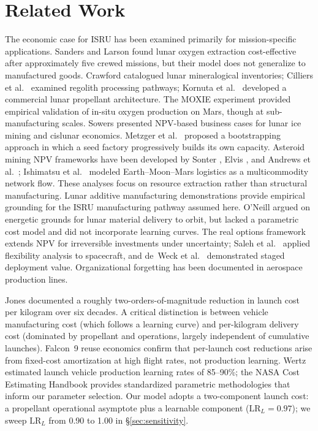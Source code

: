 \documentclass[5p,twocolumn]{elsarticle}
\begin{document}
\section{Related Work}
\label{sec:related}

The economic case for ISRU has been examined primarily for mission-specific applications. Sanders and Larson \cite{sanders2015} found lunar oxygen extraction cost-effective after approximately five crewed missions, but their model does not generalize to manufactured goods. Crawford \cite{crawford2015} catalogued lunar mineralogical inventories; Cilliers et al.\ \cite{cilliers2023} examined regolith processing pathways; Kornuta et al.\ \cite{kornuta2019} developed a commercial lunar propellant architecture. The MOXIE experiment \cite{hecht2021} provided empirical validation of in-situ oxygen production on Mars, though at sub-manufacturing scales. Sowers \cite{sowers2021,sowers2023} presented NPV-based business cases for lunar ice mining and cislunar economics. Metzger et al.\ \cite{metzger2013} proposed a bootstrapping approach in which a seed factory progressively builds its own capacity. Asteroid mining NPV frameworks have been developed by Sonter \cite{sonter1997}, Elvis \cite{elvis2012}, and Andrews et al.\ \cite{andrews2015}; Ishimatsu et al.\ \cite{ishimatsu2016} modeled Earth--Moon--Mars logistics as a multicommodity network flow. These analyses focus on resource extraction rather than structural manufacturing. Lunar additive manufacturing demonstrations \cite{werkheiser2015,cesaretti2014} provide empirical grounding for the ISRU manufacturing pathway assumed here. O'Neill \cite{oneill1974,oneill1976} argued on energetic grounds for lunar material delivery to orbit, but lacked a parametric cost model and did not incorporate learning curves. The real options framework \cite{dixit1994} extends NPV for irreversible investments under uncertainty; Saleh et al.\ \cite{saleh2003} applied flexibility analysis to spacecraft, and de~Weck et al.\ \cite{deweck2004} demonstrated staged deployment value. Organizational forgetting \cite{benkard2000,thompson2012} has been documented in aerospace production lines.

Jones \cite{jones2018,jones2020,jones2022} documented a roughly two-orders-of-magnitude reduction in launch cost per kilogram over six decades. A critical distinction is between vehicle manufacturing cost (which follows a learning curve) and per-kilogram delivery cost (dominated by propellant and operations, largely independent of cumulative launches). Falcon~9 reuse economics \cite{zapata2019} confirm that per-launch cost reductions arise from fixed-cost amortization at high flight rates, not production learning. Wertz \cite{wertz2011} estimated launch vehicle production learning rates of 85--90\%; the NASA Cost Estimating Handbook \cite{nasa2015handbook} provides standardized parametric methodologies that inform our parameter selection. Our model adopts a two-component launch cost: a propellant operational asymptote plus a learnable component ($\mathrm{LR}_L = 0.97$); we sweep $\mathrm{LR}_L$ from 0.90 to 1.00 in \S\ref{sec:sensitivity}.
\end{document}
